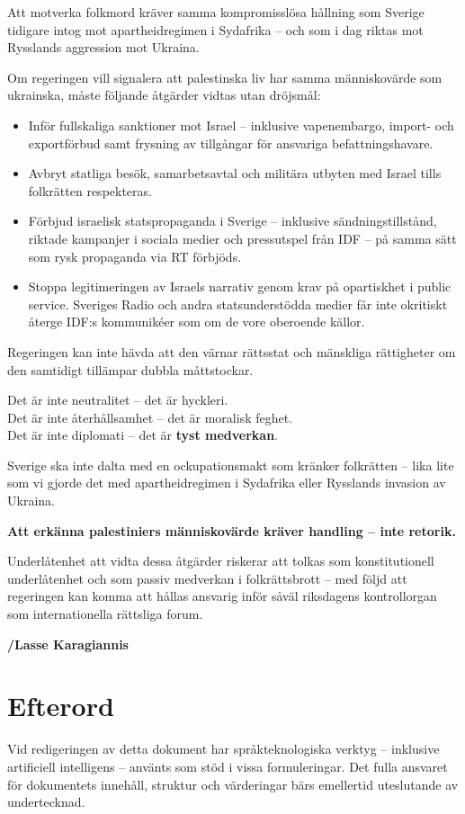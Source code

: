 \documentclass[12pt]{article}
\begin{document}
Att motverka folkmord kräver samma kompromisslösa hållning som Sverige tidigare intog mot apartheidregimen i Sydafrika – och som i dag riktas mot Rysslands aggression mot Ukraina.

Om regeringen vill signalera att palestinska liv har samma människovärde som ukrainska, måste följande åtgärder vidtas utan dröjsmål:

\begin{itemize}
  \item Inför fullskaliga sanktioner mot Israel – inklusive vapenembargo, import- och exportförbud samt frysning av tillgångar för ansvariga befattningshavare.
  \item Avbryt statliga besök, samarbetsavtal och militära utbyten med Israel tills folkrätten respekteras.
  \item Förbjud israelisk statspropaganda i Sverige – inklusive sändningstillstånd, riktade kampanjer i sociala medier och pressutspel från IDF – på samma sätt som rysk propaganda via RT förbjöds.
  \item Stoppa legitimeringen av Israels narrativ genom krav på opartiskhet i public service. Sveriges Radio och andra statsunderstödda medier får inte okritiskt återge IDF:s kommunikéer som om de vore oberoende källor.
\end{itemize}

Regeringen kan inte hävda att den värnar rättsstat och mänskliga rättigheter om den samtidigt tillämpar dubbla måttstockar.

Det är inte neutralitet – det är hyckleri.\\
Det är inte återhållsamhet – det är moralisk feghet.\\
Det är inte diplomati – det är \textbf{tyst medverkan}.

Sverige ska inte dalta med en ockupationsmakt som kränker folkrätten – lika lite som vi gjorde det med apartheidregimen i Sydafrika eller Rysslands invasion av Ukraina.

\textbf{Att erkänna palestiniers människovärde kräver handling – inte retorik.}


Underlåtenhet att vidta dessa åtgärder riskerar att tolkas som konstitutionell underlåtenhet och som passiv medverkan i folkrättsbrott – med följd att regeringen kan komma att hållas ansvarig inför såväl riksdagens kontrollorgan som internationella rättsliga forum.


\vspace{1cm}
\noindent
\textbf{/Lasse Karagiannis}

\section*{Efterord}
Vid redigeringen av detta dokument har språkteknologiska verktyg – inklusive artificiell intelligens – använts som stöd i vissa formuleringar.  
Det fulla ansvaret för dokumentets innehåll, struktur och värderingar bärs emellertid uteslutande av undertecknad.
\end{document}
